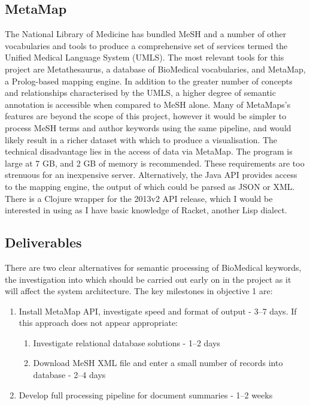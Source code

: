 \documentclass[PROP_AGutteridge_CS.tex]{subfiles}
\begin{document}
\subsection{MetaMap}
The National Library of Medicine has bundled MeSH and a number of other vocabularies and tools to produce a comprehensive set of services termed the Unified Medical Language System (UMLS)\cite{bodenreider}. The most relevant tools for this project are Metathesaurus, a database of BioMedical vocabularies, and MetaMap, a Prolog-based mapping engine\cite{aronson}. In addition to the greater number of concepts and relationships characterised by the UMLS, a higher degree of semantic annotation is accessible when compared to MeSH alone. Many of MetaMaps's features are beyond the scope of this project, however it would be simpler to process MeSH terms and author keywords using the same pipeline, and would likely result in a richer dataset with which to produce a visualisation. The technical disadvantage lies in the access of data via MetaMap. The program is large at 7 GB, and 2 GB of memory is recommended. These requirements are too strenuous for an inexpensive server. Alternatively, the Java API provides access to the mapping engine, the output of which could be parsed as JSON or XML. There is a Clojure wrapper for the 2013v2 API release, which I would be interested in using as I have basic knowledge of Racket, another Lisp dialect. \newpage

\subsection{Deliverables}
There are two clear alternatives for semantic processing of BioMedical keywords, the investigation into which should be carried out early on in the project as it will affect the system architecture. The key milestones in objective 1 are:
\begin{enumerate}
\item{Install MetaMap API, investigate speed and format of output - 3--7 days. If this approach does not appear appropriate:}
	\begin{enumerate}
	\item{Investigate relational database solutions - 1--2 days}
	\item{Download MeSH XML file and enter a small number of records into database - 2--4 days}
	\end{enumerate}
\item{Develop full processing pipeline for document summaries - 1--2 weeks}
\end{enumerate}
\end{document}
